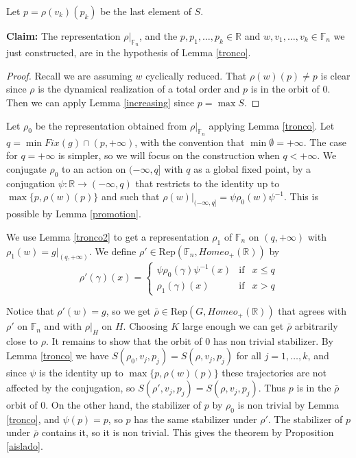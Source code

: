 \documentclass[12pt]{article}
\newcommand{\F}{\mathbb{F}}
\newcommand{\R}{\mathbb{R}}
\theoremstyle{definition}
\newcommand{\vs}{\vspace{0.3cm}}
\begin{document}
Let $p=\rho(v_k)(p_k)$ be the last element of $S$. 



\vs
{\flushleft \bf Claim:} The representation $\rho|_{\F_n}$, and the $p,p_1,\ldots,p_k\in\R$ and $w,v_1,\ldots,v_k\in\F_n$ we just constructed, are in the hypothesis of Lemma \ref{tronco}.
\vs

\begin{proof}
Recall we are assuming $w$ cyclically reduced. That $\rho(w)(p)\neq p$ is clear since $\rho$ is the dynamical realization of a total order and $p$ is in the orbit of $0$. Then we can apply Lemma \ref{increasing} since $p=\max S$.
\end{proof}

Let $\rho_0$ be the representation obtained from $\rho|_{\F_n}$ applying Lemma \ref{tronco}. Let $q=\min Fix(g)\cap (p,+\infty)$, with the convention that $\min\emptyset=+\infty$. The case for $q=+\infty$ is simpler, so we will focus on the construction when $q<+\infty$. We conjugate $\rho_0$ to an action on $(-\infty,q]$ with $q$ as a global fixed point, by a conjugation $\psi:\R\to (-\infty,q)$ that restricts to the identity up to $\max\{p,\rho(w)(p)\}$ and such that $\rho(w)|_{(-\infty,q]} = \psi \rho_0(w) \psi^{-1}$. This is possible by Lemma \ref{promotion}.

We use Lemma \ref{tronco2} to get a representation $\rho_1$ of $\F_n$ on $(q,+\infty)$ with $\rho_1(w)=g|_{(q,+\infty)}$. We define $\rho'\in \text{Rep}(\F_n,Homeo_{+}(\R))$ by $$\rho'(\gamma)(x)=\left\{ \begin{array}{ccc} \psi\rho_0(\gamma)\psi^{-1}(x) & \text{if}& x\leq q \\ \rho_1(\gamma)(x) &\text{if}& x>q \end{array}\right.$$  

Notice that $\rho'(w)=g$, so we get $\bar{\rho}\in \text{Rep}(G,Homeo_{+}(\R))$ that agrees with $\rho'$ on $\F_n$ and with $\rho|_H$ on $H$. Choosing $K$ large enough we can get $\bar{\rho}$ arbitrarily close to $\rho$. It remains to show that the orbit of $0$ has non trivial stabilizer. By Lemma \ref{tronco} we have $S(\rho_0,v_j,p_j)=S(\rho,v_j,p_j)$ for all $j=1,\ldots,k$, and since $\psi$ is the identity up to $\max\{p,\rho(w)(p)\}$ these trajectories are not affected by the conjugation, so $S(\rho',v_j,p_j)= S(\rho,v_j,p_j)$. Thus $p$ is in the $\bar{\rho}$ orbit of $0$. On the other hand, the stabilizer of $p$ by $\rho_0$ is non trivial by Lemma \ref{tronco}, and $\psi(p)=p$, so $p$ has the same stabilizer under $\rho'$. The stabilizer of $p$ under $\bar{\rho}$ contains it, so it is non trivial. This gives the theorem by Proposition \ref{aislado}.
\end{document}
